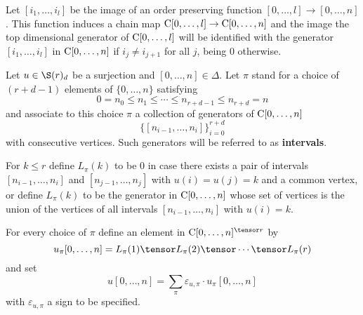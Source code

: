 \documentclass[thesis.tex]{subfiles}
\begin{document}
Let $[i_1,\dotsc,i_l]$ be the image of an order preserving function $[0,\dotsc,l]\to[0,\dotsc,n]$. This function induces a chain map $\operatorname{C} [0,\dotsc,l]\to\operatorname{C} [0,\dotsc,n]$ and the image the top dimensional generator of $\operatorname{C} [0,\dotsc,l]$ will be identified with the generator $[i_1,\dotsc,i_l]$ in $\operatorname{C} [0,\dotsc,n]$ if $i_j\neq i_{j+1}$ for all $j$, being $0$ otherwise.

Let $u\in\S(r)_d$ be a surjection and $[0,\dotsc,n]\in\Delta$. Let $\pi$ stand for a choice of $(r+d-1)$ elements of $\{0,\dotsc,n\}$ satisfying $$0=n_0\leq n_1\leq\dotsb\leq n_{r+d-1}\leq n_{r+d}=n$$
and associate to this choice $\pi$ a collection of generators of $\operatorname{C} [0,\dotsc,n]$
$$\big\{[n_{i-1},\dotsc,n_i]\big\}_{i=0}^{r+d}$$
with consecutive vertices. Such generators will be referred to as \textbf{intervals}.

For $k\leq r$ define $L_{\pi}(k)$ to be $0$ in case there exists a pair of intervals $[n_{i-1},\dotsc,n_i]$ and $[n_{j-1},\dotsc,n_j]$ with $u(i)=u(j)=k$ and a common vertex, or define $L_{\pi}(k)$ to be the generator in $\operatorname{C}[0,\dotsc,n]$ whose set of vertices is the union of the vertices of all intervals $[n_{i-1},\dotsc,n_i]$ with $u(i)=k$.

For every choice of $\pi$ define an element in $\chains[0,\dotsc,n]^{\tensor r}$ by $$u_\pi[0,\dotsc,n]=L_{\pi}(1)\tensor L_{\pi}(2)\tensor\dotsb\tensor L_{\pi}(r)$$
and set
$$u[0,\dotsc,n]=\sum_\pi\varepsilon_{u,\pi}\cdot u_\pi[0,\dotsc,n]$$ with $\varepsilon_{u,\pi}$ a sign to be specified.
\end{document}
